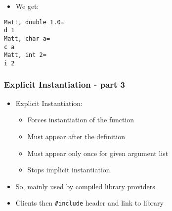 \begin{Shaded}
\begin{Highlighting}[]

\NormalTok{\{}
  \NormalTok{ << }
\NormalTok{);}
  \NormalTok{ << }
\NormalTok{);}
  \NormalTok{ << }
\NormalTok{);}
\NormalTok{\}}
\end{Highlighting}
\end{Shaded}

\begin{itemize}
\tightlist
\item
  We get:
\end{itemize}

\begin{verbatim}
Matt, double 1.0=
d 1
Matt, char a=
c a
Matt, int 2=
i 2
\end{verbatim}

\hypertarget{explicit-instantiation---part-3}{%
\subsubsection{Explicit Instantiation - part
3}\label{explicit-instantiation---part-3}}

\begin{itemize}
\tightlist
\item
  Explicit Instantiation:

  \begin{itemize}
  \tightlist
  \item
    Forces instantiation of the function
  \item
    Must appear after the definition
  \item
    Must appear only once for given argument list
  \item
    Stops implicit instantiation
  \end{itemize}
\item
  So, mainly used by compiled library providers
\item
  Clients then \texttt{\#include} header and link to library
\end{itemize}

